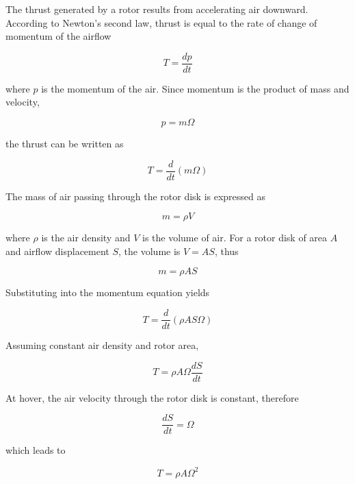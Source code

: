 \begin{small}
The thrust generated by a rotor results from accelerating air downward. 
According to Newton’s second law, thrust is equal to the rate of change of momentum of the airflow

\begin{equation}
T = \frac{dp}{dt} 
\end{equation}

where $p$ is the momentum of the air. Since momentum is the product of mass and velocity,

\begin{equation}
p = m\Omega
\end{equation}

the thrust can be written as

\begin{equation}
T = \frac{d}{dt}(m\Omega)
\end{equation}

The mass of air passing through the rotor disk is expressed as

\begin{equation}
m = \rho V
\end{equation}

where $\rho$ is the air density and $V$ is the volume of air. 
For a rotor disk of area $A$ and airflow displacement $S$, the volume is $V = AS$, thus

\begin{equation}
m = \rho AS
\end{equation}

Substituting into the momentum equation yields

\begin{equation}
T = \frac{d}{dt}(\rho AS\Omega)
\end{equation}

Assuming constant air density and rotor area,

\begin{equation}
T = \rho A \Omega \frac{dS}{dt}
\end{equation}

At hover, the air velocity through the rotor disk is constant, therefore

\begin{equation}
\frac{dS}{dt} = \Omega
\end{equation}

which leads to

\begin{equation}
T = \rho A \Omega^2
\end{equation}


\end{small}
